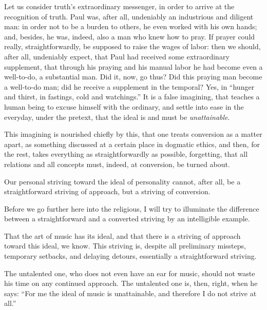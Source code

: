 \documentclass[12pt,a4paper]{book}
\begin{document}
Let us consider truth's extraordinary messenger, in order to arrive at the recognition of truth. Paul was, after all, undeniably an industrious and diligent man: in order not to be a burden to others, he even worked with his own hands; and, besides, he was, indeed, also a man who knew how to pray. If prayer could really, straightforwardly, be supposed to raise the wages of labor: then we should, after all, undeniably expect, that Paul had received some extraordinary supplement, that through his praying and his manual labor he had become even a well-to-do, a substantial man. Did it, now, go thus? Did this praying man become a well-to-do man; did he receive a supplement in the temporal? Yes, in ``hunger and thirst, in fastings, cold and watchings.''
It is a false imagining, that teaches a human being to excuse himself with the ordinary, and settle into ease in the everyday, under the pretext, that the ideal is and must be \emph{unattainable}.

This imagining is nourished chiefly by this, that one treats conversion as a matter apart, as something discussed at a certain place in dogmatic ethics, and then, for the rest, takes everything as straightforwardly as possible, forgetting, that all relations and all concepts must, indeed, at conversion, be turned about.

Our personal striving toward the ideal of personality cannot, after all, be a straightforward striving of approach, but a striving of conversion.

Before we go further here into the religious, I will try to illuminate the difference between a straightforward and a converted striving by an intelligible example.

That the art of music has its ideal, and that there is a striving of approach toward this ideal, we know. This striving is, despite all preliminary missteps, temporary setbacks, and delaying detours, essentially a straightforward striving.

The untalented one, who does not even have an ear for music, should not waste his time on any continued approach. The untalented one is, then, right, when he says: ``For me the ideal of music is unattainable, and therefore I do not strive at all.''
\end{document}
